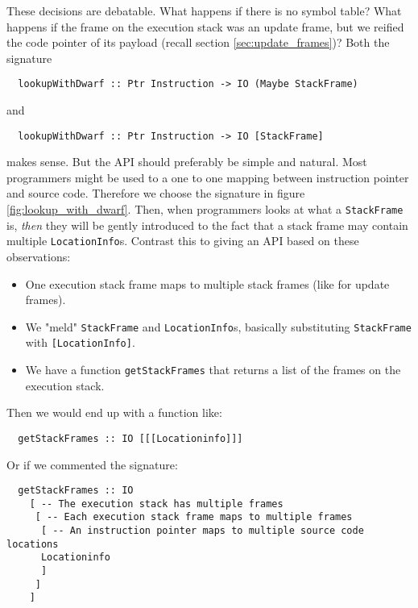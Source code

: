 These decisions are debatable. What happens if there is no symbol
table? What happens if the frame on the execution stack was an update
frame, but we reified the code pointer of its payload (recall section
\ref{sec:update_frames})? Both the signature

\begin{verbatim}
  lookupWithDwarf :: Ptr Instruction -> IO (Maybe StackFrame)
\end{verbatim}

and

\begin{verbatim}
  lookupWithDwarf :: Ptr Instruction -> IO [StackFrame]
\end{verbatim}

makes sense. But the API should preferably be simple and natural. Most
programmers might be used to a one to one mapping between instruction pointer
and source code. Therefore we choose the signature in figure
\ref{fig:lookup_with_dwarf}. Then, when programmers looks at what a
\texttt{StackFrame} is, \emph{then} they will be gently introduced to
the fact that a stack frame may contain multiple \texttt{LocationInfo}s.
Contrast this to giving an API based on these observations:

\begin{itemize}
  \item
    One execution stack frame maps to multiple stack frames (like for
    update frames).
  \item
    We "meld" \texttt{StackFrame} and \texttt{LocationInfo}s, basically
    substituting \texttt{StackFrame} with \texttt{[LocationInfo]}.
  \item
    We have a function \texttt{getStackFrames} that returns a list of the
    frames on the execution stack.
\end{itemize}

Then we would end up with a function like:

\begin{verbatim}
  getStackFrames :: IO [[[Locationinfo]]]
\end{verbatim}

Or if we commented the signature:

\begin{verbatim}
  getStackFrames :: IO
    [ -- The execution stack has multiple frames
     [ -- Each execution stack frame maps to multiple frames
      [ -- An instruction pointer maps to multiple source code locations
      Locationinfo
      ]
     ]
    ]
\end{verbatim}

